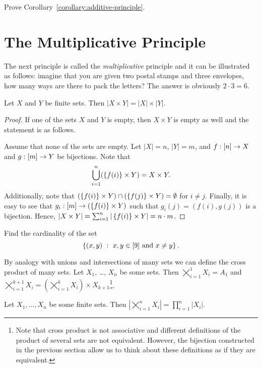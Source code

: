\begin{exercise}
  Prove Corollary~\ref{corollary:additive-principle}.
\end{exercise}


\section{The Multiplicative Principle}
The next principle is called the \emph{multiplicative} principle and it can be
illustrated as follows: imagine that you are given two postal stamps and
three envelopes, how many ways are there to pack the letters? The answer is obviously
$2 \cdot 3 = 6$.
\begin{theorem}
  Let $X$ and $Y$ be finite sets. Then $|X \times Y| = |X| \times |Y|$.
\end{theorem}
\begin{proof}
  If one of the sets $X$ and $Y$ is empty, then $X \times Y$ is empty as well
  and the statement is as follows.

  Assume that none of the sets are empty. Let $|X| = n$, $|Y| = m$, and
  $f : {[{n}]} \to X$ and $g : {[{m}]} \to Y$ be bijections.
  Note that
  \[
    \bigcup_{i = 1}^n (\set{f(i)} \times Y) = X \times Y.
  \]
  Additionally, note that $(\set{f(i)} \times Y) \cap (\set{f(j)} \times Y) =
  \emptyset$ for $i \neq j$. Finally, it is easy to see that $g_i : \range{m} \to
  (\set{f(i)} \times Y)$ such that $g_i(j) = (f(i), g(j))$ is a bijection.
  Hence,
  $|X \times Y| = \sum_{i = 1}^n |\set{f(i)} \times Y| = n \cdot m$.
\end{proof}

\begin{exercise}
  Find the cardinality of the set
  \[
    \set[{x, y \in [9] \text{ and } x \neq y}]{(x, y)}.
  \]
\end{exercise}

By analogy with unions and intersections of many sets we can define the cross
product of many sets.
Let $X_1$, \dots, $X_n$ be some sets. Then $\bigtimes_{i = 1}^1 X_i = A_1$ and
$\bigtimes_{i = 1}^{k + 1} X_i =
  \left(\bigtimes_{i = 1}^k X_i\right) \times X_{k + 1}$\footnote{%
    Note that cross product is not associative and different definitions of the
    product of several sets are not equivalent. However, the bijection
    constructed in the previous section allow us to think about these
    definitions as if they are equivalent.
}.

\begin{corollary}
\label{corollary:multiplicative-principle}
  Let $X_1, \dots, X_n$ be some finite sets. Then
  $\left|\bigtimes_{i = 1}^n X_i\right| = \prod_{i = 1}^n |X_i|$.
\end{corollary}


